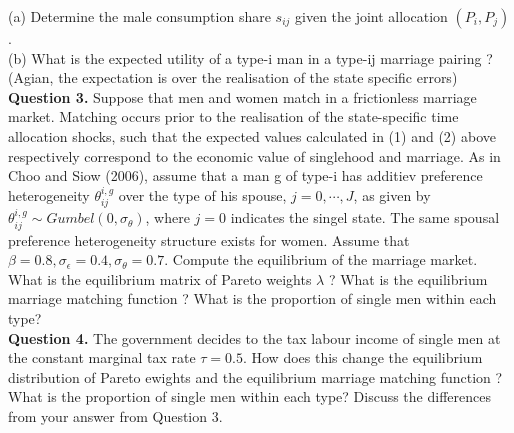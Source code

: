 \documentclass[paper=a4, fontsize=13pt]{extarticle} %
\numberwithin{equation}{section} %
\numberwithin{figure}{section} %
\numberwithin{table}{section} %
\begin{document}
(a) Determine the male consumption share $s_{ij}$ given the joint allocation $(P_i, P_j)$. \\

(b) What is the expected utility of a type-i man in a type-ij marriage pairing ? (Agian, the expectation is over the realisation of the state specific errors) \\

\textbf{Question 3.} Suppose that men and women match in a frictionless marriage market. Matching occurs prior to the realisation of the state-specific time allocation shocks, such that the expected values calculated in (1) and (2) above respectively correspond to the economic value of singlehood and marriage. As in Choo and Siow (2006), assume that a man g of type-i has additiev preference heterogeneity $\theta_{ij}^{i,g}$ over the type of his spouse, $j = 0, \cdots, J$, as given by $\theta_{ij}^{i,g} \sim Gumbel(0, \sigma_{\theta})$, where $j=0$ indicates the singel state. The same spousal preference heterogeneity structure exists for women. Assume that $\beta=0.8, \sigma_{\epsilon} = 0.4, \sigma_{\theta} = 0.7$. Compute the equilibrium of the marriage market. What is the equilibrium matrix of Pareto weights $\lambda$ ? What is the equilibrium marriage matching function ? What is the proportion of single men within each type? \\

\textbf{Question 4.} The government decides to the tax labour income of single men at the constant marginal tax rate $\tau = 0.5$. How does this change the equilibrium distribution of Pareto ewights and the equilibrium marriage matching function ? What is the proportion of single men within each type? Discuss the differences from your answer from Question 3.
\end{document}
